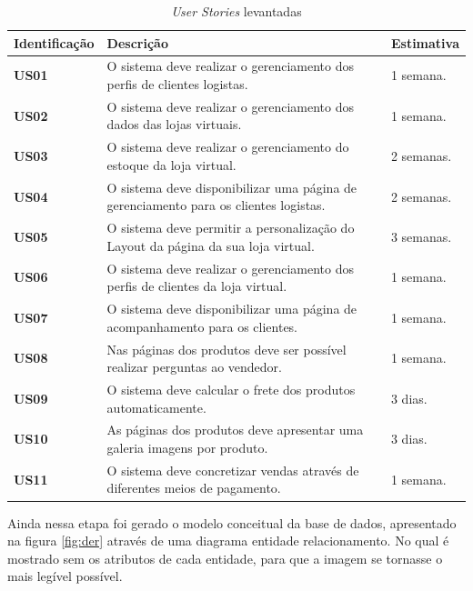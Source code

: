 \documentclass[a4paper,12pt]{monografia}
\begin{document}
\begin{longtable}{|p{3cm}|p{9cm}|p{3cm}|}
\caption{\textit{\textit{User Stories}} levantadas}
\label{quadro:userstories}
\hline
\rowcolor{ballblue}
\textbf{Identificação} & \textbf{Descrição} & \textbf{Estimativa}\\
\hline
\textbf{US01} & O sistema deve realizar o gerenciamento dos perfis de clientes logistas. & 1 semana.\\
\hline
\textbf{US02} & O sistema deve realizar o gerenciamento dos dados das lojas virtuais. & 1 semana.\\
\hline
\textbf{US03} & O sistema deve realizar o gerenciamento do estoque da loja virtual. & 2 semanas.\\
\hline
\textbf{US04} & O sistema deve disponibilizar uma página de gerenciamento para os clientes logistas. & 2 semanas.\\
\hline
\textbf{US05} & O sistema deve permitir a personalização do Layout da página da sua loja virtual. & 3 semanas.\\
\hline
\textbf{US06} & O sistema deve realizar o gerenciamento dos perfis de clientes da loja virtual. & 1 semana.\\
\hline
\textbf{US07} & O sistema deve disponibilizar uma página de acompanhamento para os clientes. & 1 semana.\\
\hline
\textbf{US08} & Nas páginas dos produtos deve ser possível realizar perguntas ao vendedor. & 1 semana.\\
\hline
\textbf{US09} & O sistema deve calcular o frete dos produtos automaticamente. & 3 dias.\\
\hline
\textbf{US10} & As páginas dos produtos deve apresentar uma galeria imagens por produto. & 3 dias.\\
\hline
\textbf{US11} & O sistema deve concretizar vendas através de diferentes meios de pagamento. & 1 semana.\\
\hline
\end{longtable}	

Ainda nessa etapa foi gerado o modelo conceitual da base de dados, apresentado na figura \ref{fig:der} através de uma diagrama entidade relacionamento. No qual é mostrado sem os atributos de cada entidade, para que a imagem se tornasse o mais legível possível. 
\end{document}
